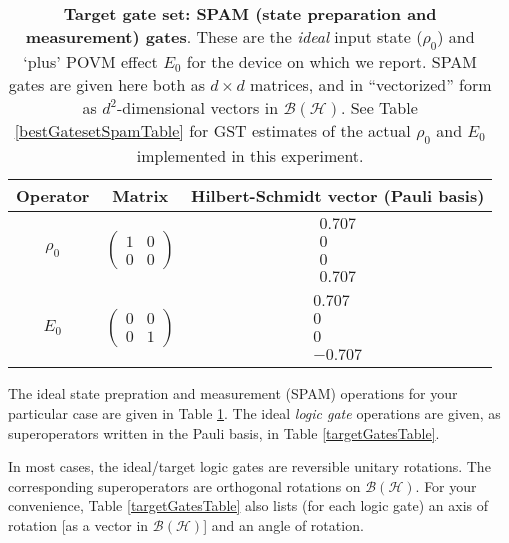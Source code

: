 \documentclass{article}[11pt]
\begin{document}
\begin{table}[h]
\begin{center}
\begin{tabular}[l]{|c|c|c|}
\hline
Operator & Matrix & Hilbert-Schmidt vector (Pauli basis) \\ \hline
$\rho_{0}$ & $ \left(\!\!\begin{array}{cc}
1 & 0 \\ 
0 & 0
 \end{array}\!\!\right) $
 & $ \begin{array}{c}
0.707 \\ 
0 \\ 
0 \\ 
0.707
 \end{array} $
 \\ \hline
$E_{0}$ & $ \left(\!\!\begin{array}{cc}
0 & 0 \\ 
0 & 1
 \end{array}\!\!\right) $
 & $ \begin{array}{c}
0.707 \\ 
0 \\ 
0 \\ 
-0.707
 \end{array} $
 \\ \hline
\end{tabular}

\caption{\textbf{Target gate set: SPAM (state preparation and measurement) gates}.  These are the \emph{ideal} input state ($\rho_0$) and `plus' POVM effect $E_0$ for the device on which we report.  SPAM gates are given here both as $d\times d$ matrices, and in ``vectorized'' form as $d^2$-dimensional vectors in $\mathcal{B}(\mathcal{H})$.  See Table \ref{bestGatesetSpamTable} for GST estimates of the actual $\rho_0$ and $E_0$ implemented in this experiment.\label{targetSpamTable}}
\end{center}
\end{table}

The ideal state prepration and measurement (SPAM) operations for your particular case are given in Table \ref{targetSpamTable}.  The ideal \emph{logic gate} operations are given, as superoperators written in the Pauli basis, in Table \ref{targetGatesTable}.

In most cases, the ideal/target logic gates are reversible unitary rotations.  The corresponding superoperators are orthogonal rotations on $\mathcal{B}(\mathcal{H})$.  For your convenience, Table \ref{targetGatesTable} also lists (for each logic gate) an axis of rotation [as a vector in $\mathcal{B}(\mathcal{H})$] and an angle of rotation.  
\end{document}
